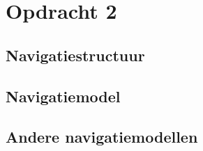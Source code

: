 \documentclass[11pt,english]{article}
\begin{document}
  \newpage
  \section{Opdracht 2}
  \subsection{Navigatiestructuur}

  \subsection{Navigatiemodel}

  \subsection{Andere navigatiemodellen}
\end{document}
